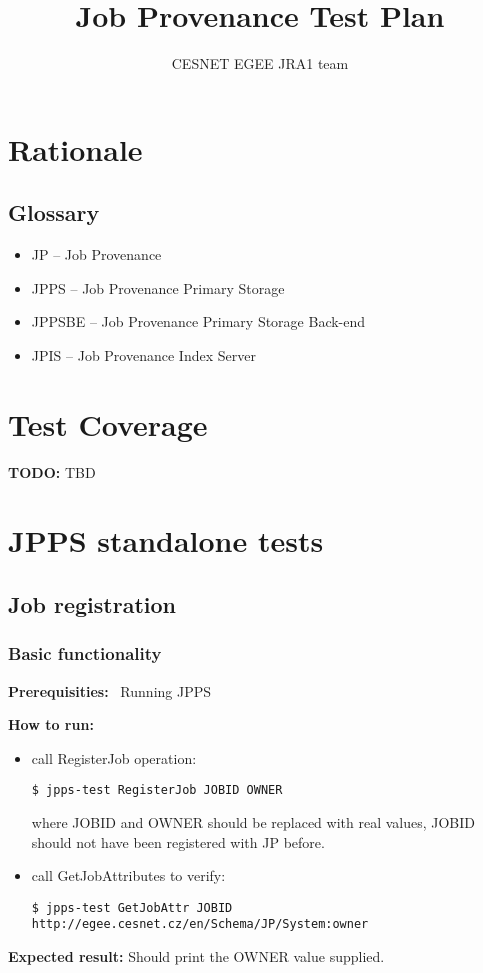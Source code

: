 \documentclass{egee}
\title{Job Provenance Test Plan}
\author{CESNET EGEE JRA1 team}
\def\req{\noindent\textbf{Prerequisities: }}
\def\how{\noindent\textbf{How to run: }}
\def\result{\noindent\textbf{Expected result: }}
\def\todo#1{\textbf{TODO:} #1}
\begin{document}

\newpage
\tableofcontents
\newpage

\section{Rationale}
\subsection{Glossary}
\begin{itemize}
\item JP -- Job Provenance
\item JPPS -- Job Provenance Primary Storage
\item JPPSBE -- Job Provenance Primary Storage Back-end
\item JPIS -- Job Provenance Index Server
\end{itemize}


\section{Test Coverage}
\todo{TBD}


\section{JPPS standalone tests}

\subsection{Job registration}

\subsubsection{Basic functionality}
\label{regjob}
\req\ Running JPPS

\how
\begin{itemize}
\item call RegisterJob operation:
\begin{verbatim}
$ jpps-test RegisterJob JOBID OWNER
\end{verbatim}
where JOBID and OWNER should be replaced with real values, JOBID should not have
been registered with JP before.

\item  call GetJobAttributes to verify:
\begin{verbatim}
$ jpps-test GetJobAttr JOBID http://egee.cesnet.cz/en/Schema/JP/System:owner
\end{verbatim}
\end{itemize}
\result Should print the OWNER value supplied.
\end{document}
